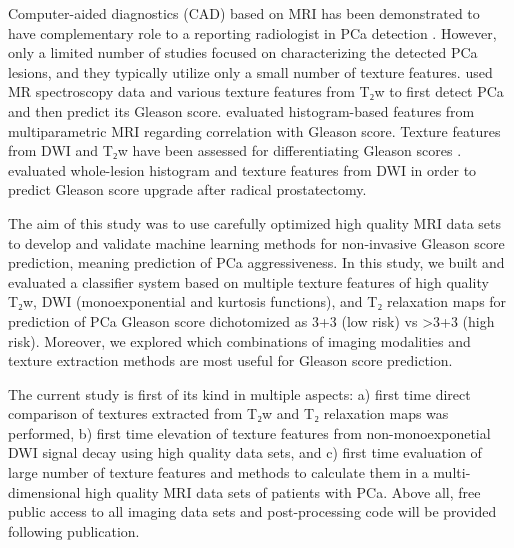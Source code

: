 Computer-aided diagnostics (CAD) based on MRI has been demonstrated to have
complementary role to a reporting radiologist in PCa detection \citep{Kwak2015,
Viswanath2012, Ginsburg2014}. However, only a limited number of studies focused
on characterizing the detected PCa lesions, and they typically utilize only a
small number of texture features. \citet{Tiwari2013} used MR spectroscopy data
and various texture features from T₂w to first detect PCa and then predict its
Gleason score. \citet{Peng2013} evaluated histogram-based features from
multiparametric MRI regarding correlation with Gleason score. Texture features
from DWI and T₂w have been assessed for differentiating Gleason scores
\citep{Wibmer2015, Vignati2015, Fehr2015}. \citet{Rozenberg2016} evaluated
whole-lesion histogram and texture features from DWI in order to predict Gleason
score upgrade after radical prostatectomy.

The aim of this study was to use carefully optimized high quality MRI data sets
to develop and validate machine learning methods for non-invasive Gleason score
prediction, meaning prediction of PCa aggressiveness. In this study, we built
and evaluated a classifier system based on multiple texture features of high
quality T₂w, DWI (monoexponential and kurtosis functions), and T₂ relaxation
maps for prediction of PCa Gleason score dichotomized as 3+3 (low risk) vs >3+3
(high risk). Moreover, we explored which combinations of imaging modalities and
texture extraction methods are most useful for Gleason score prediction.

The current study is first of its kind in multiple aspects: a) first time direct
comparison of textures extracted from T₂w and T₂ relaxation maps was performed,
b) first time elevation of texture features from non-monoexponetial DWI signal
decay using high quality data sets, and c) first time evaluation of large number
of texture features and methods to calculate them in a multi-dimensional high
quality MRI data sets of patients with PCa. Above all, free public access to all
imaging data sets and post-processing code will be provided following
publication.
